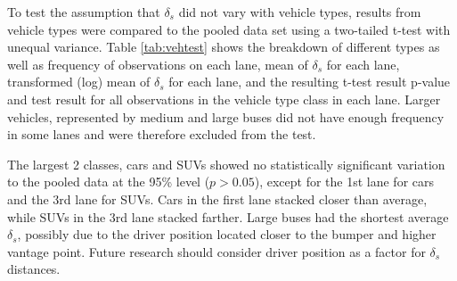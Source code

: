 To test the assumption that $\delta_{s}$ did not vary with vehicle types, results from vehicle types were compared to the pooled data set using a two-tailed t-test with unequal variance. Table \ref{tab:vehtest} shows the breakdown of different types as well as frequency of observations on each lane, mean of  $\delta_{s}$ for each lane, transformed (log) mean of  $\delta_{s}$ for each lane, and the resulting t-test result p-value and test result for all observations in the vehicle type class in each lane. Larger vehicles, represented by medium and large buses did not have enough frequency in some lanes and were therefore excluded from the test. 

\begin{table}[H]
\centering
\caption{Results of significance testing of individual vehicle types and pooled data.}
\label{tab:vehtest}
\end{table}

The largest 2 classes, cars and SUVs showed no statistically significant variation to the pooled data at the 95\% level ($p>0.05$), except for the 1st lane for cars and the 3rd lane for SUVs. Cars in the first lane stacked closer than average, while SUVs in the 3rd lane stacked farther. Large buses had the shortest average $\delta_{s}$, possibly due to the driver position located closer to the bumper and higher vantage point. Future research should consider driver position as a factor for $\delta_{s}$ distances.


